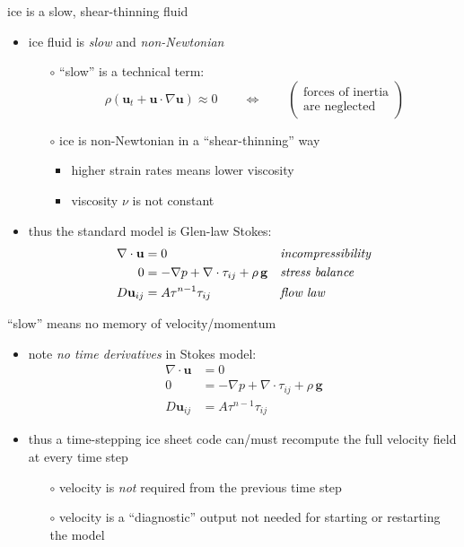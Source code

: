 \documentclass[10pt,dvipsnames]{beamer}
\begin{document}
\begin{frame}{ice is a slow, shear-thinning fluid}

\begin{itemize}
\item ice fluid is \emph{slow} and \emph{non-Newtonian}
    \begin{itemize}
    \item[$\circ$] ``slow'' is a technical term:
      $$\rho \left(\mathbf{u}_t + \mathbf{u}\cdot\nabla \mathbf{u}\right) \approx 0 \qquad \iff \qquad \begin{pmatrix} \text{forces of inertia} \\ \text{are neglected} \end{pmatrix}$$
    \item[$\circ$] ice is non-Newtonian in a ``shear-thinning'' way
        \begin{itemize}
        \item higher strain rates means lower viscosity
        \item viscosity $\nu$ is not constant
        \end{itemize}
    \end{itemize}

\bigskip
\item thus the standard model is Glen-law Stokes:
\begin{align*}
\nabla \cdot \mathbf{u} &= 0 &&\text{\emph{incompressibility}} \\
0 &= - \nabla p + \nabla \cdot \tau_{ij} + \rho\, \mathbf{g} &&\text{\emph{stress balance}} \\
D\mathbf{u}_{ij} &= A \tau^{n-1} \tau_{ij} &&\text{\emph{flow law}}
\end{align*}

\end{itemize}
\end{frame}


\begin{frame}{``slow'' means no memory of velocity/momentum}

\begin{itemize}
\item note \emph{no time derivatives} in Stokes model:
\small
\begin{align*}
\nabla \cdot \mathbf{u} &= 0 \\
0 &= - \nabla p + \nabla \cdot \tau_{ij} + \rho\, \mathbf{g} \\
D\mathbf{u}_{ij} &= A \tau^{n-1} \tau_{ij}
\end{align*}
\normalsize
\item thus a time-stepping ice sheet code can/must recompute the full velocity field at every time step
  \begin{itemize}
  \item[$\circ$] velocity is \emph{not} required from the previous time step
  \item[$\circ$] velocity is a ``diagnostic'' output not needed for starting or restarting the model
  \end{itemize}
\end{itemize}
\end{frame}
\end{document}
